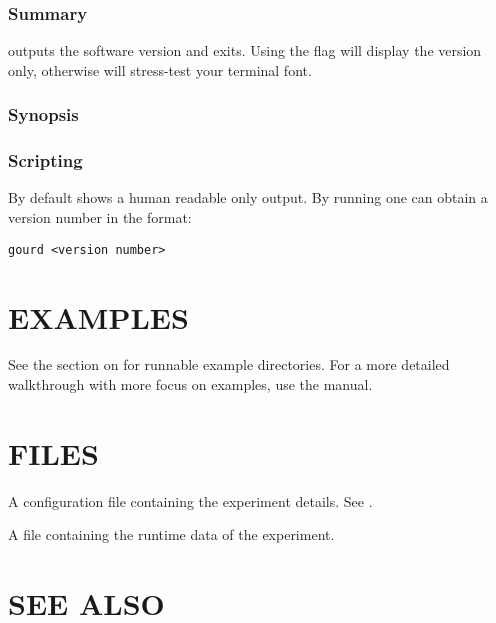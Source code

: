 \documentclass[a4paper,english]{article}
\begin{document}
\begin{adjustwidth}{18pt}{0pt}
            \subsubsection{Summary}
                  outputs the software version and exits.
                Using the  flag will display the version only, otherwise 
                will stress-test your terminal font.

            \subsubsection{Synopsis}
                  

            \subsubsection{Scripting}
                By default   shows a human readable only output. By
                running    one can obtain a version number
                in the format:

                \texttt{gourd <version number>}

    \section{EXAMPLES}

        See the section on   for runnable example directories.
        For a more detailed walkthrough with more focus on examples, use the  manual.

    \section{FILES}

        \begin{Description}[Files]\setlength{\itemsep}{0cm}
            \item[\File{gourd.toml}] A configuration file containing the experiment details. See .
            \item[\File{<experiment-dir>/<experiment-number>.lock}] A file containing the runtime data of the experiment.
        \end{Description}

    \section{SEE ALSO}


\end{adjustwidth}
\end{document}
